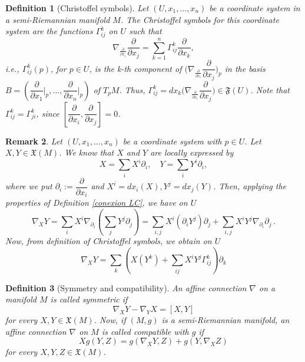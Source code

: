 \documentclass[11pt]{book}
\newtheorem{defi}{Definition}[chapter]
\newtheorem{rem}[defi]{Remark}
\def\F{\mathfrak F}
\def\x{\mathfrak X}
\begin{document}
\begin{defi}[Christoffel symbols]
	Let $(U,x_1,...,x_n)$ be a coordinate system in a semi-Riemannian manifold $M$. The Christoffel symbols for this coordinate system are the functions $\Gamma_{ij}^k$ on $U$ such that
	\[
	\nabla_{\frac{\partial}{\partial x_i}}\frac{\partial}{\partial x_j}=\sum_{k=1}^n \Gamma_{ij}^k \frac{\partial}{\partial x_k},
	\]
	i.e., $\Gamma_{ij}^k(p)$, for $p\in U$, is the k-th component of $\Big(\nabla_{\frac{\partial}{\partial x_i}}\dfrac{\partial}{\partial x_j}\Big)_p$ in the basis $B=\left(\dfrac{\partial}{\partial x_1}\Big|_p,...,\dfrac{\partial}{\partial x_n}\Big|_p\right)$ of $T_pM$. Thus, $\Gamma_{ij}^k=dx_k\Big(\nabla_{\frac{\partial}{\partial x_i}}\dfrac{\partial}{\partial x_j}\Big)\in \F(U)$. Note that $\Gamma_{ij}^k=\Gamma_{ji}^k$, since $\left[\dfrac{\partial}{\partial x_i},\dfrac{\partial}{\partial x_j}\right]=0$. 
\end{defi}


\begin{rem}
	{\rm Let $(U,x_1,...,x_n)$ be a coordinate system with $p\in U$. Let $X,Y\in \x(M)$. We know that $X$ and $Y$ are locally expressed by
		\[
		X=\sum_i X^i \partial_i ,\quad Y=\sum_i Y^i \partial_i,
		\]
		where we put $\partial_i:=\dfrac{\partial}{\partial x_i}$ and $X^i=dx_i(X), Y^j=dx_j(Y)$. Then, applying the properties of Definition \ref{conexion LC}, we have on $U$
		\[
		\nabla_X Y=\sum_i X^i \nabla_{\partial_i}(\sum_j Y^j \partial_j)=\sum_{i,j} X^i(\partial_i Y^j)\partial_j + \sum_{i,j} X^iY^j \nabla_{\partial_i}\partial_j\,.
		\]
		Now, from definition of Christoffel symbols, we obtain on $U$
		\begin{equation}
			\nabla_X Y=\sum_k \left( X(Y^k) + \sum_{ij} X^i Y^j \Gamma_{ij}^k \right) \partial_k 
		\end{equation}
		
	}
\end{rem}

\begin{defi}[Symmetry and compatibility]
	An affine connection $\nabla$ on a manifold $M$ is called symmetric if
	\[
	\nabla_X Y-\nabla_Y X=[X,Y]
	\]
	for every $X,Y\in \x(M)$. Now, if $(M,g)$ is a semi-Riemannian manifold, an affine connection $\nabla$ on $M$ is called compatible with $g$ if
	\[
	Xg(Y,Z)=g(\nabla_X Y,Z)+g(Y,\nabla_X Z)
	\]
	for every $X,Y,Z\in \x(M)$.
\end{defi}
\end{document}
